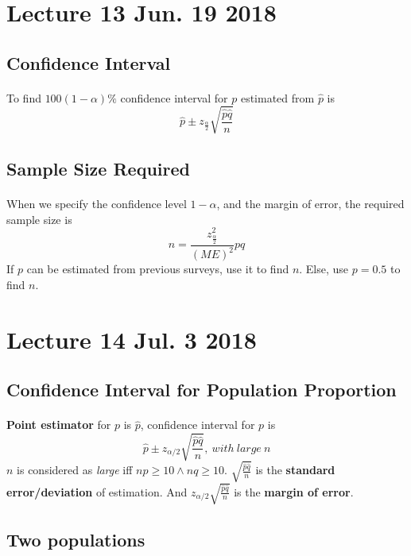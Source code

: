 \documentclass{article}
\begin{document}
	\section{Lecture 13 Jun. 19 2018}
		\subsection{Confidence Interval}
			\paragraph{} To find $100(1-\alpha)\%$ confidence interval for $p$ estimated from $\hat{p}$ is
			\[
				\hat{p} \pm z_{\frac{\alpha}{2}}\sqrt{\frac{\hat{p}\hat{q}}{n}}
			\]
		
		\subsection{Sample Size Required}
			\paragraph{} When we specify the confidence level $1-\alpha$, and the margin of error, the required sample size is
			\[
				n = \frac{z_{\frac{\alpha}{2}}^2}{(ME)^2}pq
			\]
			If $p$ can be estimated from previous surveys, use it to find $n$. Else, use $p=0.5$ to find $n$.
			
	\section{Lecture 14 Jul. 3 2018}
		\subsection{Confidence Interval for Population Proportion}
			\paragraph{} \textbf{Point estimator} for $p$ is $\hat{p}$, confidence interval for $p$ is 
				\[
					\hat{p} \pm z_{\alpha/2} \sqrt{\frac{\hat{p}\hat{q}}{n}},\ with\ large\ n
				\]
				$n$ is considered as \emph{large} iff $np \geq 10 \land nq \geq 10$.
				$\sqrt{\frac{\hat{p}\hat{q}}{n}}$ is the \textbf{standard error/deviation} of estimation. 
				And $z_{\alpha/2} \sqrt{\frac{\hat{p}\hat{q}}{n}}$ is the \textbf{margin of error}. 
		\subsection{Two populations}
\end{document}
